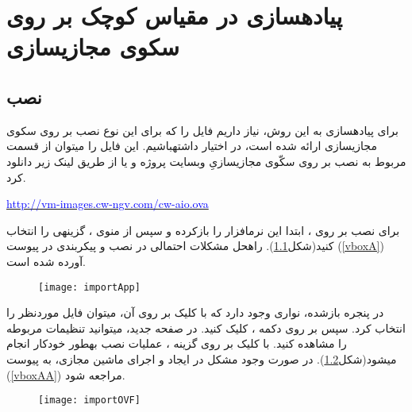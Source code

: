 \chapter{پیاده\nf سازی در مقیاس کوچک بر روی سکوی مجازی\nf سازی}
\label{cwaio}
\section{نصب}
برای پیاده\nf سازی به این روش، نیاز داریم فایل  را که برای این نوع نصب بر روی سکوی مجازی\nf سازی ارائه شده است، در اختیار داشته\nf باشیم.  این فایل را می\nf توان از قسمت مربوط به نصب  بر روی سکّوی مجازی\nf سازیِ وب\nf سایت پروژه \href{http://projectclearwater.org}{} و یا از طریق لینک زیر دانلود کرد. 

\begin{latin}
\setlength{\parindent}{0ex}
\href{http://vm-images.cw-ngv.com/cw-aio.ova}{\textcolor{blue}{http://vm-images.cw-ngv.com/cw-aio.ova}}
\end{latin}

برای نصب بر روی ، ابتدا این نرم\nf افزار را بازکرده و سپس از منوی ، گزینه\nf ی  را انتخاب کنید(شکل\ref{importApp}). راه\nf حل مشکلات احتمالی در نصب و پیکربندی  در پیوست (\ref{vboxA})  آورده شده است.

\begin{figure}[H]
\centering
\texttt{[image: importApp]}
\caption{}
\label{importApp}
\end{figure}
در پنجره بازشده، نواری وجود دارد که با کلیک بر روی آن، می\nf توان فایل موردنظر را انتخاب کرد. سپس بر روی دکمه ، کلیک کنید. در صفحه جدید، می\nf توانید تنظیمات مربوطه را مشاهده کنید. با کلیک بر روی گزینه ، عملیات نصب به\nf طور خودکار انجام می\nf شود(شکل\ref{importOVF}). در صورت وجود مشکل در ایجاد و اجرای ماشین مجازی، به پیوست (\ref{vboxAA}) مراجعه شود.

\begin{figure}[H]
\centering
\texttt{[image: importOVF]}
\caption{}
\label{importOVF}
\end{figure}

